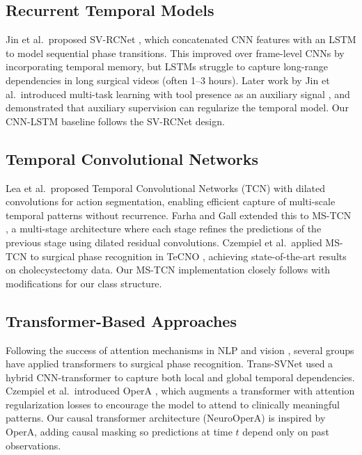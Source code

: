 \documentclass[10pt,twocolumn]{article}
\begin{document}
\subsection{Recurrent Temporal Models}

Jin et al.\ proposed SV-RCNet \cite{jin2018svrcnet}, which concatenated CNN features with an LSTM to model sequential phase transitions. This improved over frame-level CNNs by incorporating temporal memory, but LSTMs struggle to capture long-range dependencies in long surgical videos (often 1--3 hours). Later work by Jin et al.\ introduced multi-task learning with tool presence as an auxiliary signal \cite{jin2020multi}, and demonstrated that auxiliary supervision can regularize the temporal model. Our CNN-LSTM baseline follows the SV-RCNet design.

\subsection{Temporal Convolutional Networks}

Lea et al.\ proposed Temporal Convolutional Networks (TCN) \cite{lea2017temporal} with dilated convolutions for action segmentation, enabling efficient capture of multi-scale temporal patterns without recurrence. Farha and Gall extended this to MS-TCN \cite{farha2019mstcn}, a multi-stage architecture where each stage refines the predictions of the previous stage using dilated residual convolutions. Czempiel et al.\ applied MS-TCN to surgical phase recognition in TeCNO \cite{czempiel2020tecno}, achieving state-of-the-art results on cholecystectomy data. Our MS-TCN implementation closely follows \cite{farha2019mstcn} with modifications for our class structure.

\subsection{Transformer-Based Approaches}

Following the success of attention mechanisms in NLP \cite{vaswani2017attention} and vision \cite{dosovitskiy2020vit}, several groups have applied transformers to surgical phase recognition. Trans-SVNet \cite{jin2021transsvnet} used a hybrid CNN-transformer to capture both local and global temporal dependencies. Czempiel et al.\ introduced OperA \cite{czempiel2021opera}, which augments a transformer with attention regularization losses to encourage the model to attend to clinically meaningful patterns. Our causal transformer architecture (NeuroOperA) is inspired by OperA, adding causal masking so predictions at time $t$ depend only on past observations.
\end{document}
